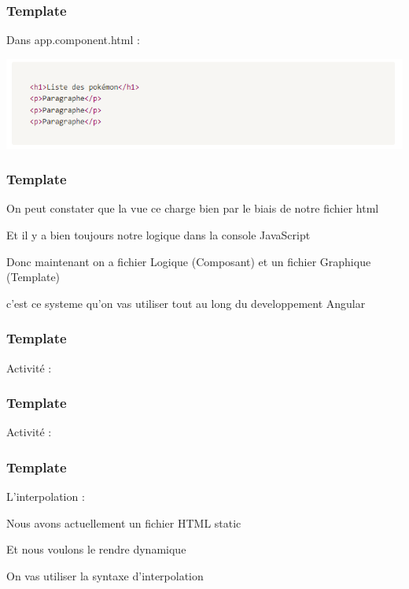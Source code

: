 \documentclass[10pt]{beamer}
\begin{document}
	\begin{frame}
		\frametitle{Template}

		Dans app.component.html : \newline

		\centering
		\includegraphics[width=14cm]{assets/templateHtml} \newline

	\end{frame}

	\begin{frame}
		\frametitle{Template}

		On peut constater que la vue ce charge bien par le biais de notre fichier html \newline \newline

		Et il y a bien toujours notre logique dans la console JavaScript  \newline \newline

		Donc maintenant on a fichier \alert{Logique} (Composant) et un fichier \alert{Graphique} (Template) \newline \newline

		c’est ce systeme qu’on vas utiliser tout au long du developpement Angular

	\end{frame}

	\begin{frame}
		\frametitle{Template}

		Activité : \newline \newline


	\end{frame}

	\begin{frame}
		\frametitle{Template}

		Activité : \newline \newline


	\end{frame}

	\begin{frame}
		\frametitle{Template}

		L'interpolation : \newline \newline

		Nous avons actuellement un fichier HTML \alert{static} \newline \newline

		Et nous voulons le rendre \alert{dynamique} \newline \newline

		On vas utiliser la syntaxe d’interpolation


	\end{frame}
\end{document}
